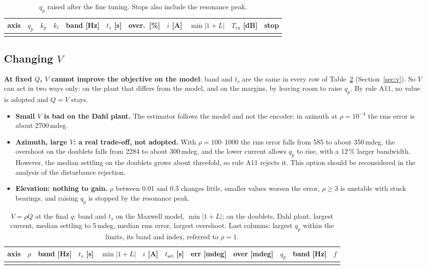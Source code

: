 \documentclass[10pt,a4paper]{article}
\numberwithin{equation}{section}
\begin{document}
\begin{table}[H]\centering\footnotesize\setlength{\tabcolsep}{3pt}
\caption{$q_p$ raised after the fine tuning. Stops also include the resonance peak.}\label{tab:raise}
\begin{tabular}{lrrrrrrrrrl}\toprule
axis & $q_p$ & $k_p$ & $k_i$ & band [Hz] & $t_s$ [s] & over.\ [\%] & $i$ [A] & $\min|1+L|$ & $T_{ry}$ [dB] & stop \\ \midrule
\\ \bottomrule
\end{tabular}\end{table}

\subsection{Changing $V$}
\textbf{At fixed $Q$, $V$ cannot improve the objective on the model}: band and $t_s$ are the same in every row of Table~\ref{tab:v2} (Section~\ref{sec:v}). So $V$ can act in two ways only: on the plant that differs from the model, and on the margins, by leaving room to raise $q_p$. By rule A11, no value is adopted and $Q=V$ stays.
\begin{itemize}
\item \textbf{Small $V$ is bad on the Dahl plant.} The estimator follows the model and not the encoder: in azimuth at $\rho=10^{-4}$ the rms error is about 2700\,mdeg.
\item \textbf{Azimuth, large $V$: a real trade-off, not adopted.} With $\rho=100$--1000 the rms error falls from 585 to about 350\,mdeg, the overshoot on the doublets falls from 2284 to about 300\,mdeg, and the lower current allows $q_p$ to rise, with a 12\,\% larger bandwidth. However, the median settling on the doublets grows about threefold, so rule A11 rejects it. This option should be reconsidered in the analysis of the disturbance rejection.
\item \textbf{Elevation: nothing to gain.} $\rho$ between 0.01 and 0.3 changes little, smaller values worsen the error, $\rho\geq3$ is unstable with stuck bearings, and raising $q_p$ is stopped by the resonance peak.
\end{itemize}

\begin{table}[H]\centering\footnotesize\setlength{\tabcolsep}{3pt}
\caption{$V=\rho Q$ at the final $q$: band and $t_s$ on the Maxwell model, $\min|1+L|$; on the doublets, Dahl plant, largest current, median settling to 5\,mdeg, median rms error, largest overshoot. Last columns: largest $q_p$ within the limits, its band and index, referred to $\rho=1$.}\label{tab:v2}
\begin{tabular}{lrrrrrrrrrrr}\toprule
axis & $\rho$ & band [Hz] & $t_s$ [s] & $\min|1+L|$ & $i$ [A] & $t_\mathrm{set}$ [s] & err [mdeg] & over [mdeg] & $q_p$ & band [Hz] & $f$ \\ \midrule
\\ \bottomrule
\end{tabular}\end{table}
\end{document}
